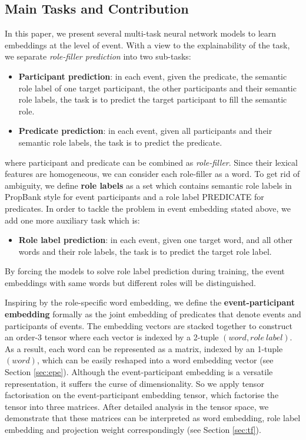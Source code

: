 \documentclass[a4paper]{article}
\begin{document}
\subsection{Main Tasks and Contribution}
In this paper, we present several multi-task neural network models to learn embeddings at the level of event. With a view to the explainability of the task, we separate \textit{role-filler prediction} into two sub-tasks: 
\begin{itemize}
  \item  \textbf{Participant prediction}: in each event, given the predicate, the semantic role label of one target participant, the other participants and their semantic role labels, the task is to predict the target participant to fill the semantic role. 
  \item  \textbf{Predicate prediction}: in each event, given all participants and their semantic role labels, the task is to predict the predicate. 
\end{itemize}
where participant and predicate can be combined as \textit{role-filler}. Since their lexical features are homogeneous, we can consider each role-filler as a word. To get rid of ambiguity, we define \textbf{role labels} as a set which contains semantic role labels in PropBank style for event participants and a role label PREDICATE for predicates. In order to tackle the problem in event embedding stated above, we add one more auxiliary task which is: 
\begin{itemize}
  \item  \textbf{Role label prediction}: in each event, given one target word, and all other words and their role labels, the task is to predict the target role label. 
\end{itemize}
By forcing the models to solve role label prediction during training, the event embeddings with same words but different roles will be distinguished. 

Inspiring by the role-specific word embedding, we define the \textbf{event-participant embedding} formally as the joint embedding of predicates that denote events and participants of events. The embedding vectors are stacked together to construct an order-3 tensor where each vector is indexed by a 2-tuple $(word, role\ label)$. As a result, each word can be represented as a matrix, indexed by an 1-tuple $(word)$, which can be easily reshaped into a word embedding vector (see Section \ref{sec:epe}). Although the event-participant embedding is a versatile representation, it suffers the curse of dimensionality. So we apply tensor factorisation on the event-participant embedding tensor, which factorise the tensor into three matrices. After detailed analysis in the tensor space, we demonstrate that these matrices can be interpreted as word embedding, role label embedding and projection weight correspondingly (see Section \ref{sec:tf}). 
\end{document}
